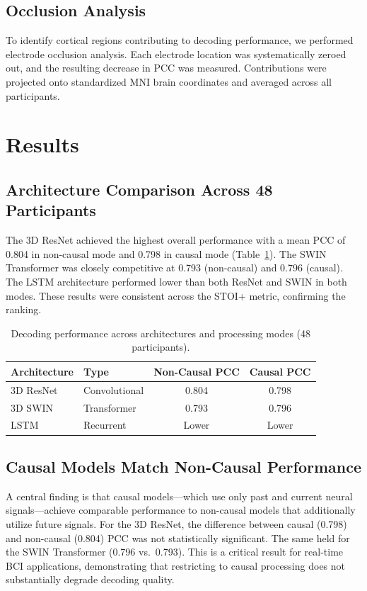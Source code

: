 \documentclass[11pt]{article}
\begin{document}
\subsection{Occlusion Analysis}

To identify cortical regions contributing to decoding performance, we performed electrode occlusion analysis. Each electrode location was systematically zeroed out, and the resulting decrease in PCC was measured. Contributions were projected onto standardized MNI brain coordinates and averaged across all participants.

\section{Results}

\subsection{Architecture Comparison Across 48 Participants}

The 3D ResNet achieved the highest overall performance with a mean PCC of 0.804 in non-causal mode and 0.798 in causal mode (Table~\ref{tab:performance}). The SWIN Transformer was closely competitive at 0.793 (non-causal) and 0.796 (causal). The LSTM architecture performed lower than both ResNet and SWIN in both modes. These results were consistent across the STOI+ metric, confirming the ranking.

\begin{table}[htbp]
\centering
\caption{Decoding performance across architectures and processing modes (48 participants).}
\label{tab:performance}
\begin{tabular}{llcc}
\toprule
\textbf{Architecture} & \textbf{Type} & \textbf{Non-Causal PCC} & \textbf{Causal PCC} \\
\midrule
3D ResNet & Convolutional & 0.804 & 0.798 \\
3D SWIN & Transformer & 0.793 & 0.796 \\
LSTM & Recurrent & Lower & Lower \\
\bottomrule
\end{tabular}
\end{table}

\subsection{Causal Models Match Non-Causal Performance}

A central finding is that causal models---which use only past and current neural signals---achieve comparable performance to non-causal models that additionally utilize future signals. For the 3D ResNet, the difference between causal (0.798) and non-causal (0.804) PCC was not statistically significant. The same held for the SWIN Transformer (0.796 vs.\ 0.793). This is a critical result for real-time BCI applications, demonstrating that restricting to causal processing does not substantially degrade decoding quality.
\end{document}
